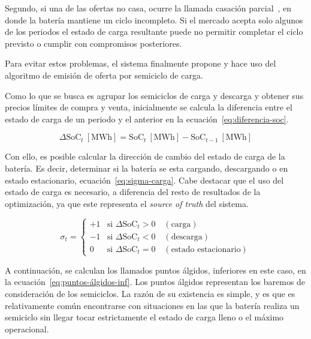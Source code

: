Segundo, si una de las ofertas no casa, ocurre la llamada casación parcial~\cite{cnmc2024mercados}, en donde la batería mantiene un ciclo incompleto. Si el mercado acepta solo algunos de los periodos el estado de carga resultante puede no permitir completar el ciclo previsto o cumplir con compromisos posteriores.

Para evitar estos problemas, el sistema finalmente propone y hace uso del algoritmo de emisión de oferta por semiciclo de carga.

Como lo que se busca es agrupar los semiciclos de carga y descarga y obtener sus precios límites de compra y venta, inicialmente se calcula la diferencia entre el estado de carga de un periodo y el anterior en la ecuación~\ref{eq:diferencia-soc}.

\begin{equation}
  \label{eq:diferencia-soc}
  \Delta \mathrm{SoC}_{t}~[\text{MWh}] = \mathrm{SoC}_{t}~[\text{MWh}] - \mathrm{SoC}_{t-1}~[\text{MWh}]
\end{equation}

Con ello, es posible calcular la dirección de cambio del estado de carga de la batería. Es decir, determinar si la batería se esta cargando, descargando o en estado estacionario, ecuación~\ref{eq:sigma-carga}. Cabe destacar que el uso del estado de carga es necesario, a diferencia del resto de resultados de la optimización, ya que este representa el \textit{source of truth} del sistema.

\begin{equation}
  \label{eq:sigma-carga}
  \sigma_{t} =
  \begin{cases}
    +1 & \text{si } \Delta\mathrm{SoC}_{t} > 0 \quad (\text{carga})\\
    -1 & \text{si } \Delta\mathrm{SoC}_{t} < 0 \quad (\text{descarga})\\
    0  & \text{si } \Delta\mathrm{SoC}_{t} = 0 \quad (\text{estado estacionario})
  \end{cases}
\end{equation}

A continuación, se calculan los llamados puntos álgidos, inferiores en este caso, en la ecuación~\ref{eq:puntos-álgidos-inf}. Los puntos álgidos representan los baremos de consideración de los semiciclos. La razón de su existencia es simple, y es que es relativamente común encontrarse con situaciones en las que la batería realiza un semiciclo sin llegar tocar estrictamente el estado de carga lleno o el máximo operacional.

